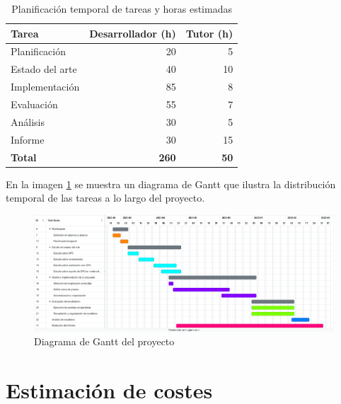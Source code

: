 \begin{table}[!ht]
    \centering
    \setlength{\tabcolsep}{3pt}
    \renewcommand{\arraystretch}{1.1}
    \begin{tabular}{|p{3cm}|r|r|}
        \hline
        \textbf{Tarea}  & \textbf{Desarrollador (h)} & \textbf{Tutor (h)} \\
        \hline
        Planificación   & 20                         & 5                  \\
        Estado del arte & 40                         & 10                 \\
        Implementación  & 85                         & 8                  \\
        Evaluación      & 55                         & 7                  \\
        Análisis        & 30                         & 5                  \\
        Informe         & 30                         & 15                 \\
        \hline
        \textbf{Total}  & \textbf{260}               & \textbf{50}        \\
        \hline
    \end{tabular}
    \caption{Planificación temporal de tareas y horas estimadas}
    \label{tab:planificacion-temporal}
\end{table}

En la imagen \ref{fig:diagrama-gantt} se muestra un diagrama de Gantt que ilustra la distribución temporal de las tareas a lo largo del proyecto.

\begin{figure}[!h]
    \centering
    \includegraphics[width=\textwidth]{imagenes/cap2/diagrama_gantt.png}
    \caption{Diagrama de Gantt del proyecto}
    \label{fig:diagrama-gantt}
\end{figure}

\section{Estimación de costes}

